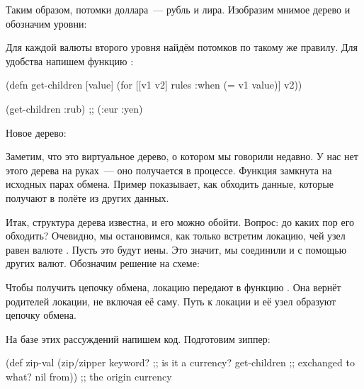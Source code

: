 Таким образом, потомки доллара~--- рубль и лира. Изобразим мнимое дерево и
обозначим уровни:

\begin{figure}[H]
  \centering
  
  \label{fig:chart-zip-14}
\end{figure}

Для каждой валюты второго уровня найдём потомков по такому же правилу. Для
удобства напишем функцию :

\begin{english}
  \begin{clojure}
(defn get-children [value]
  (for [[v1 v2] rules
        :when (= v1 value)]
    v2))

(get-children :rub)
;; (:eur :yen)
  \end{clojure}
\end{english}

Новое дерево:

\begin{figure}[H]
  \centering
  
  \label{fig:chart-zip-15}
\end{figure}

Заметим, что это виртуальное дерево, о котором мы говорили недавно. У нас нет
этого дерева на руках~--- оно получается в процессе. Функция
 замкнута на исходных парах обмена. Пример показывает, как
обходить данные, которые получают в полёте из других данных.

Итак, структура дерева известна, и его можно обойти. Вопрос: до каких пор его
обходить? Очевидно, мы остановимся, как только встретим локацию, чей узел равен
валюте . Пусть это будут иены. Это значит, мы соединили  и
 с помощью других валют. Обозначим решение на схеме:

\begin{figure}[H]
  \centering
  
  \label{fig:chart-zip-16}
\end{figure}

Чтобы получить цепочку обмена, локацию  передают в функцию
. Она вернёт родителей локации, не включая её саму. Путь к
локации и её узел образуют цепочку обмена.

На базе этих рассуждений напишем код. Подготовим зиппер:

\begin{english}
  \begin{clojure}
(def zip-val
  (zip/zipper keyword?      ;; is it a currency?
              get-children  ;; exchanged to what?
              nil
              from))        ;; the origin currency
  \end{clojure}
\end{english}

